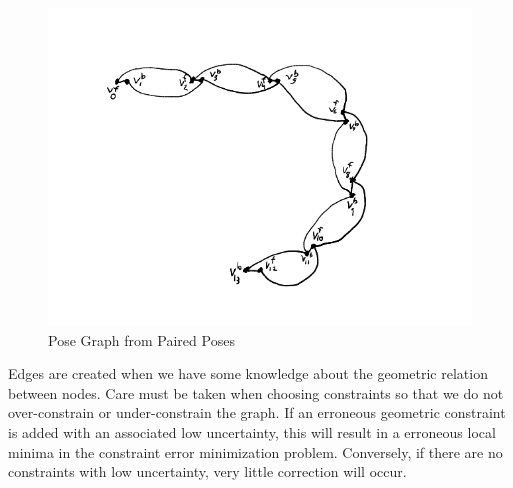 \begin{figure}
  \begin{center}
    \includegraphics[scale=0.7]{5_pose_graph_paired.png}
  \end{center}
  \caption{Pose Graph from Paired Poses}
	\label{fig:paired_pose_graph}
\end{figure}



Edges are created when we have some knowledge about the geometric relation between nodes.  Care must be taken when choosing constraints so that we do not over-constrain or under-constrain the graph.  If an erroneous geometric constraint is added with an associated low uncertainty, this will result in a erroneous local minima in the constraint error minimization problem.  Conversely, if there are no constraints with low uncertainty, very little correction will occur.

